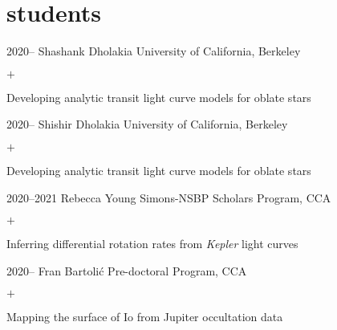 \documentclass[]{luger-cv} %
\begin{document}


\ifdefined \withother

    \section{students}
    \begin{entrylist}


        \entry
        {2020--}
        {Shashank Dholakia}
        {University of California, Berkeley}
        {%
            \vspace{-1em}
            \begin{list}{$+$}{\cvlist}
                \item Developing analytic transit light curve models for oblate stars
            \end{list}
        }


        \entry
        {2020--}
        {Shishir Dholakia}
        {University of California, Berkeley}
        {%
            \vspace{-1em}
            \begin{list}{$+$}{\cvlist}
                \item Developing analytic transit light curve models for oblate stars
            \end{list}
        }


        \entry
        {2020--2021}
        {Rebecca Young}
        {Simons-NSBP Scholars Program, CCA}
        {%
            \vspace{-1em}
            \begin{list}{$+$}{\cvlist}
                \item Inferring differential rotation rates from \emph{Kepler} light curves
            \end{list}
        }


        \entry
        {2020--}
        {Fran Bartoli\'c}
        {Pre-doctoral Program, CCA}
        {%
            \vspace{-1em}
            \begin{list}{$+$}{\cvlist}
                \item Mapping the surface of Io from Jupiter occultation data
            \end{list}
        }


\end{entrylist}
\end{document}
